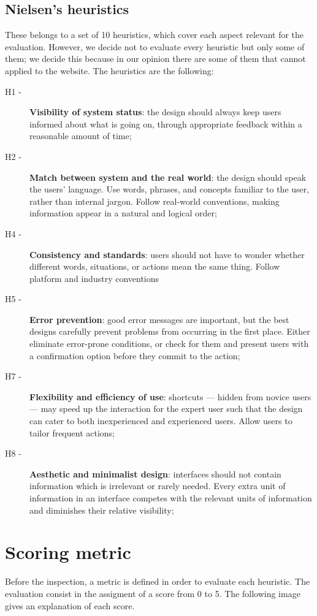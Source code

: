 \subsection{Nielsen's heuristics}
These belongs to a set of 10 heuristics, which cover each aspect relevant for the evaluation. However, we decide not to evaluate every heuristic but only some of them; we decide this because in our opinion there are some of them that cannot applied to the website.
The heuristics are the following:
\begin{description} 
\item[H1 -] \textbf{Visibility of system status}: the design should always keep users informed about what is going on, through appropriate feedback within a reasonable amount of time;
\item[H2 -] \textbf{Match between system and the real world}: the design should speak the users' language. Use words, phrases, and concepts familiar to the user, rather than internal jargon. Follow real-world conventions, making information appear in a natural and logical order;
\item[H4 -] \textbf{Consistency and standards}: users should not have to wonder whether different words, situations, or actions mean the same thing. Follow platform and industry conventions
\item[H5 -] \textbf{Error prevention}: good error messages are important, but the best designs carefully prevent problems from occurring in the first place. Either eliminate error-prone conditions, or check for them and present users with a confirmation option before they commit to the action;
\item[H7 -] \textbf{Flexibility and efficiency of use}: shortcuts — hidden from novice users — may speed up the interaction for the expert user such that the design can cater to both inexperienced and experienced users. Allow users to tailor frequent actions;
\item[H8 -] \textbf{Aesthetic and minimalist design}: interfaces should not contain information which is irrelevant or rarely needed. Every extra unit of information in an interface competes with the relevant units of information and diminishes their relative visibility;
\end{description}


\section{Scoring metric}
Before the inspection, a metric is defined in order to evaluate each heuristic. The evaluation consist in the assigment of a score from 0 to 5. The following image gives an explanation of each score.

